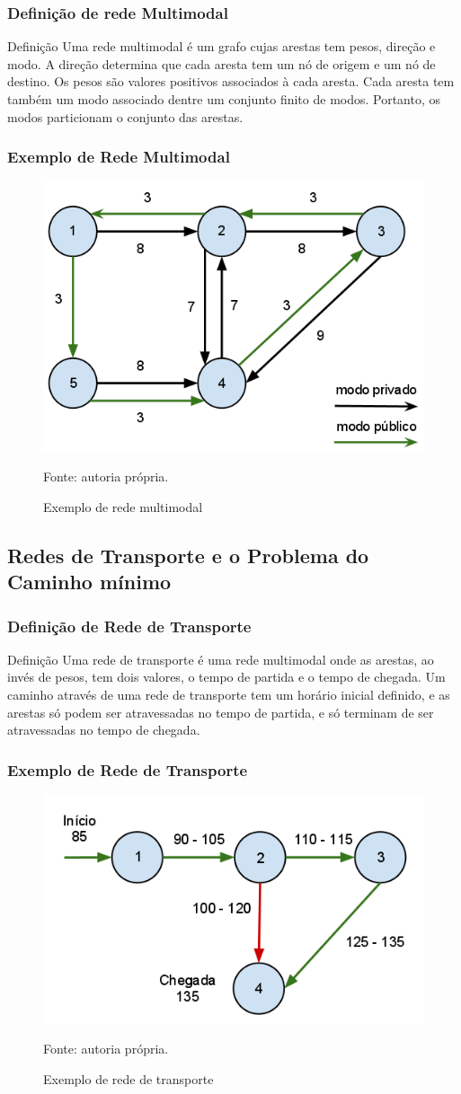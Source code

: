 \frame
{
\frametitle{Definição de rede Multimodal}
\begin{block}{Definição}
Uma rede multimodal é um grafo cujas arestas tem pesos, direção e modo. A direção determina que cada aresta tem um nó de origem e um nó de destino.
Os pesos são valores positivos associados à cada aresta. Cada aresta tem também um modo associado dentre um conjunto finito de modos. Portanto, os modos particionam o conjunto das arestas.
\end{block}
}

\frame
{
\frametitle{Exemplo de Rede Multimodal}
	\begin{figure}
		\includegraphics[width=.7\textwidth]{./imgs/multimodal.png}
		\caption{Exemplo de rede multimodal}
		\tiny
		Fonte: autoria própria.
	\end{figure}
}

\subsection{Redes de Transporte e o Problema do Caminho mínimo}
\frame
{
\frametitle{Definição de Rede de Transporte}
\begin{block}{Definição}
Uma rede de transporte é uma rede multimodal onde as arestas, ao invés de pesos, tem dois valores, o tempo de partida e o tempo de chegada. Um caminho através de uma rede de transporte tem um horário inicial definido, e as arestas só podem ser atravessadas no tempo de partida, e só terminam de ser atravessadas no tempo de chegada.
\end{block}
}

\frame
{
\frametitle{Exemplo de Rede de Transporte}
	\begin{figure}
		\includegraphics[width=.7\textwidth]{./imgs/redetransporte.png}
		\caption{Exemplo de rede de transporte}
		\tiny
		Fonte: autoria própria.
	\end{figure}
}

